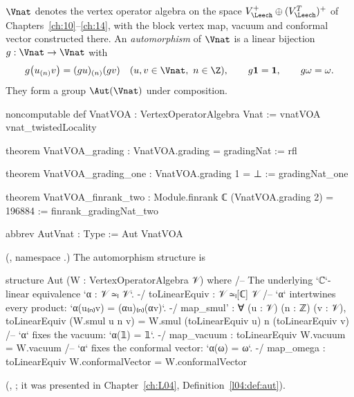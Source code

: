 \begin{definition}\label{ch16:def:vnatvoa}
$\Vnat$ denotes the vertex operator algebra on the space $V_\Leech^+\oplus(V_\Leech^T)^+$ of
Chapters~\ref{ch:10}--\ref{ch:14}, with the block vertex map, vacuum and conformal vector constructed there.  An
\emph{automorphism} of $\Vnat$ is a linear bijection $g:\Vnat\to\Vnat$ with
\begin{equation*}
  g\bigl(u_{(n)}v\bigr)=(gu)_{(n)}(gv)\quad(u,v\in\Vnat,\ n\in\Z),\qquad g\mathbf 1=\mathbf 1,\qquad g\omega=\omega .
\end{equation*}
They form a group $\Aut(\Vnat)$ under composition.
\end{definition}
\begin{leancode}
noncomputable def VnatVOA : VertexOperatorAlgebra Vnat := vnatVOA vnat_twistedLocality

theorem VnatVOA_grading : VnatVOA.grading = gradingNat := rfl

theorem VnatVOA_grading_one : VnatVOA.grading 1 = ⊥ := gradingNat_one

theorem VnatVOA_finrank_two : Module.finrank ℂ (VnatVOA.grading 2) = 196884 :=
  finrank_gradingNat_two

abbrev AutVnat : Type := Aut VnatVOA
\end{leancode}
(, namespace .)  The automorphism structure is
\begin{leancode}
structure Aut (W : VertexOperatorAlgebra 𝒱) where
  /-- The underlying `ℂ`-linear equivalence `α : 𝒱 ≃ₗ 𝒱`. -/
  toLinearEquiv : 𝒱 ≃ₗ[ℂ] 𝒱
  /-- `α` intertwines every product: `α(u₍ₙ₎v) = (αu)₍ₙ₎(αv)`. -/
  map_smul' : ∀ (u : 𝒱) (n : ℤ) (v : 𝒱),
    toLinearEquiv (W.smul u n v) = W.smul (toLinearEquiv u) n (toLinearEquiv v)
  /-- `α` fixes the vacuum: `α(𝟙) = 𝟙`. -/
  map_vacuum : toLinearEquiv W.vacuum = W.vacuum
  /-- `α` fixes the conformal vector: `α(ω) = ω`. -/
  map_omega : toLinearEquiv W.conformalVector = W.conformalVector
\end{leancode}
(, ; it was presented in Chapter~\ref{ch:L04},
Definition~\ref{l04:def:aut}).


